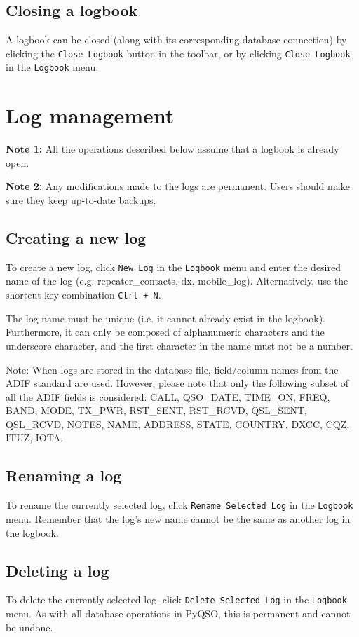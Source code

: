 \documentclass[11pt, a4paper]{report}
\begin{document}
\section{Closing a logbook}
A logbook can be closed (along with its corresponding database connection) by clicking the \texttt{Close Logbook} button in the toolbar, or by clicking \texttt{Close Logbook} in the \texttt{Logbook} menu.

\chapter{Log management}\label{chap:log_management}
\noindent\textbf{Note 1:} All the operations described below assume that a logbook is already open.

\noindent\textbf{Note 2:} Any modifications made to the logs are permanent. Users should make sure they keep up-to-date backups.

\section{Creating a new log}
To create a new log, click \texttt{New Log} in the \texttt{Logbook} menu and enter the desired name of the log (e.g. repeater\_contacts, dx, mobile\_log). Alternatively, use the shortcut key combination \texttt{Ctrl + N}. 

The log name must be unique (i.e. it cannot already exist in the logbook). Furthermore, it can only be composed of alphanumeric characters and the underscore character, and the first character in the name must not be a number. 

Note: When logs are stored in the database file, field/column names from the ADIF standard are used. However, please note that only the following subset of all the ADIF fields is considered: CALL, QSO\_DATE, TIME\_ON, FREQ, BAND, MODE, TX\_PWR, RST\_SENT, RST\_RCVD, QSL\_SENT, QSL\_RCVD, NOTES, NAME, ADDRESS, STATE, COUNTRY, DXCC, CQZ, ITUZ, IOTA.

\section{Renaming a log}
To rename the currently selected log, click \texttt{Rename Selected Log} in the \texttt{Logbook} menu. Remember that the log's new name cannot be the same as another log in the logbook.

\section{Deleting a log}
To delete the currently selected log, click \texttt{Delete Selected Log} in the \texttt{Logbook} menu. As with all database operations in PyQSO, this is permanent and cannot be undone.
\end{document}

